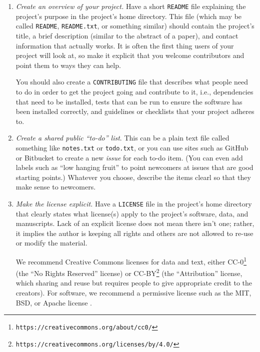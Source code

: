 \documentclass[10pt]{article}
\newcommand{\recommend}[1]{\textit{#1}}
\newcommand{\withurl}[2]{{#1}\footnote{\texttt{#2}}}
\begin{document}
\begin{enumerate}

\item
  \recommend{Create an overview of your project.}  Have a short
  \texttt{README} file explaining the project's purpose in the
  project's home directory.  This file (which may be called
  \texttt{README}, \texttt{README.txt}, or something similar) should
  contain the project's title, a brief description (similar to the
  abstract of a paper), and contact information that actually works.
  It is often the first thing users of your project will look at, so
  make it explicit that you welcome contributors and point them to
  ways they can help.
  
  You should also create a \texttt{CONTRIBUTING} file that describes
  what people need to do in order to get the project going and
  contribute to it, i.e., dependencies that need to be installed,
  tests that can be run to ensure the software has been installed
  correctly, and guidelines or checklists that your project adheres
  to.

\item
  \recommend{Create a shared public ``to-do'' list}.  This can be a
  plain text file called something like \texttt{notes.txt} or
  \texttt{todo.txt}, or you can use sites such as GitHub or Bitbucket
  to create a new \emph{issue} for each to-do item. (You can even add
  labels such as ``low hanging fruit'' to point newcomers at issues
  that are good starting points.)  Whatever you choose, describe the
  items clearl so that they make sense to newcomers.

\item
  \recommend{Make the license explicit.}  Have a \texttt{LICENSE}
  file in the project's home directory that clearly states what
  license(s) apply to the project's software, data, and
  manuscripts. Lack of an explicit license does not mean there isn't
  one; rather, it implies the author is keeping all rights and others
  are not allowed to re-use or modify the material.

  We recommend Creative Commons licenses for data and text, either
  \withurl{CC-0}{https://creativecommons.org/about/cc0/} (the ``No
  Rights Reserved'' license) or
  \withurl{CC-BY}{https://creativecommons.org/licenses/by/4.0/} (the
  ``Attribution'' license, which sharing and reuse but requires people
  to give appropriate credit to the creators).  For software, we
  recommend a permissive license such as the MIT, BSD, or Apache
  license \cite{laurent2004}.


\end{enumerate}
\end{document}
